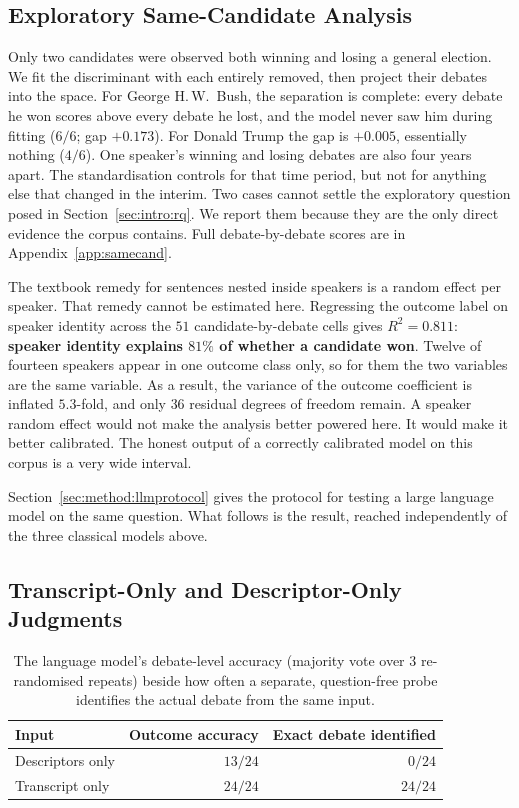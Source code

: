 \documentclass[pdflatex,sn-mathphys-num]{sn-jnl}%
\begin{document}
\subsection{Exploratory Same-Candidate Analysis}
\label{sec:method:samecand}

Only two candidates were observed both winning and losing a general
election. We fit the discriminant with each entirely removed, then project
their debates into the space. For George H.\,W.\ Bush, the separation is
complete: every debate he won scores above every debate he lost, and the
model never saw him during fitting ($6/6$; gap $+0.173$). For Donald Trump
the gap is $+0.005$, essentially nothing ($4/6$). One speaker's winning and
losing debates are also four years apart. The standardisation controls for
that time period, but not for anything else that changed in the interim.
Two cases cannot settle the exploratory question posed in
Section~\ref{sec:intro:rq}. We report them because they are the only direct
evidence the corpus contains. Full debate-by-debate scores are in
Appendix~\ref{app:samecand}.

The textbook remedy for sentences nested inside speakers is a random
effect per speaker. That remedy cannot be estimated here. Regressing the
outcome label on speaker identity across the $51$ candidate-by-debate cells
gives $R^2 = 0.811$: \textbf{speaker identity explains $81\%$ of whether a
candidate won}. Twelve of fourteen speakers appear in one outcome class
only, so for them the two variables are the same variable. As a result, the
variance of the outcome coefficient is inflated $5.3$-fold, and only $36$
residual degrees of freedom remain. A speaker random effect would not make
the analysis better powered here. It would make it better calibrated. The
honest output of a correctly calibrated model on this corpus is a very wide
interval.

Section~\ref{sec:method:llmprotocol} gives the protocol for testing a large
language model on the same question. What follows is the result, reached
independently of the three classical models above.

\subsection{Transcript-Only and Descriptor-Only Judgments}
\label{sec:method:llm}
\label{sec:llm:accuracy}

\begin{table}[t]
\caption{The language model's debate-level accuracy (majority vote over $3$
re-randomised repeats) beside how often a separate, question-free probe
identifies the actual debate from the same input.}
\label{tab:crossmodal}
\centering
\footnotesize
\setlength{\tabcolsep}{4pt}
\begin{tabular}{lrr}
\toprule
Input             & Outcome accuracy & Exact debate identified \\
\midrule
Descriptors only  & $13/24$          & $0/24$ \\
Transcript only   & $24/24$          & $24/24$ \\
\bottomrule
\end{tabular}
\end{table}
\end{document}
